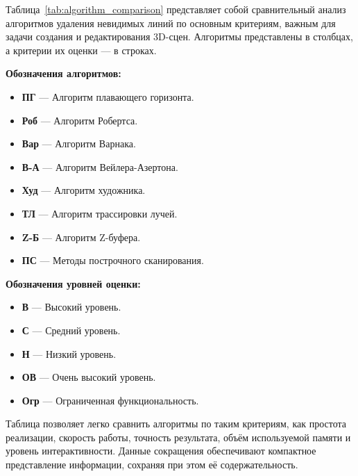 \hspace{1.25cm}
Таблица~\ref{tab:algorithm_comparison} представляет собой сравнительный анализ алгоритмов удаления невидимых линий по основным критериям, важным для задачи создания и редактирования 3D-сцен. Алгоритмы представлены в столбцах, а критерии их оценки — в строках. 

\textbf{Обозначения алгоритмов:}
\begin{itemize}
    \item \textbf{ПГ} — Алгоритм плавающего горизонта.
    \item \textbf{Роб} — Алгоритм Робертса.
    \item \textbf{Вар} — Алгоритм Варнака.
    \item \textbf{В-А} — Алгоритм Вейлера-Азертона.
    \item \textbf{Худ} — Алгоритм художника.
    \item \textbf{ТЛ} — Алгоритм трассировки лучей.
    \item \textbf{Z-Б} — Алгоритм Z-буфера.
    \item \textbf{ПС} — Методы построчного сканирования.
\end{itemize}

\textbf{Обозначения уровней оценки:}
\begin{itemize}
    \item \textbf{В} — Высокий уровень.
    \item \textbf{С} — Средний уровень.
    \item \textbf{Н} — Низкий уровень.
    \item \textbf{ОВ} — Очень высокий уровень.
    \item \textbf{Огр} — Ограниченная функциональность.
\end{itemize}

Таблица позволяет легко сравнить алгоритмы по таким критериям, как простота реализации, скорость работы, точность результата, объём используемой памяти и уровень интерактивности. Данные сокращения обеспечивают компактное представление информации, сохраняя при этом её содержательность.



